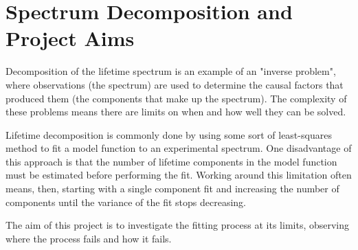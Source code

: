 \section{Spectrum Decomposition and Project Aims}

Decomposition of the lifetime spectrum is an example of an "inverse problem", where observations (the spectrum) are used to determine the causal factors that produced them (the components that make up the spectrum). The complexity of these problems means there are limits on when and how well they can be solved.

Lifetime decomposition is commonly done by using some sort of least-squares method to fit a model function to an experimental spectrum. One disadvantage of this approach is that the number of lifetime components in the model function must be estimated before performing the fit. Working around this limitation often means, then, starting with a single component fit and increasing the number of components until the variance of the fit stops decreasing.

The aim of this project is to investigate the fitting process at its limits, observing where the process fails and how it fails.

